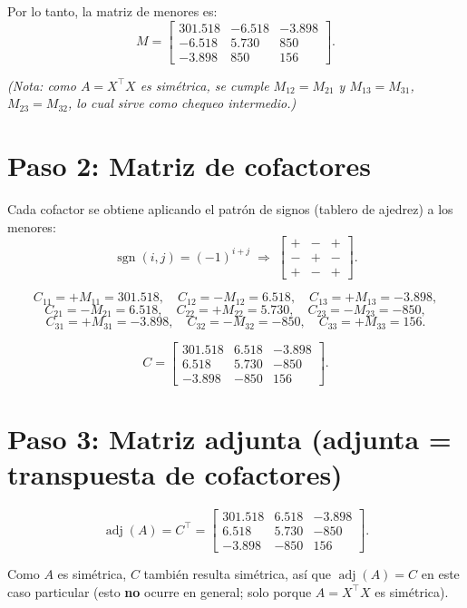 \documentclass[11pt]{article}
\begin{document}
Por lo tanto, la matriz de menores es:
\[
  M=\begin{bmatrix}
    301.518 & -6.518 & -3.898\\
    -6.518 & 5.730 & 850\\
    -3.898 & 850 & 156
  \end{bmatrix}.
\]

\emph{(Nota: como $A=X^\top X$ es simétrica, se cumple $M_{12}=M_{21}$ y $M_{13}=M_{31}$, $M_{23}=M_{32}$, lo cual sirve como chequeo intermedio.)}

\section{Paso 2: Matriz de cofactores}

Cada cofactor se obtiene aplicando el patrón de signos (tablero de ajedrez) a los menores:
\[
  \operatorname{sgn}(i,j)=(-1)^{i+j}
  \;\Longrightarrow\;
  \begin{bmatrix}
    + & - & +\\
    - & + & -\\
    + & - & +
  \end{bmatrix}.
\]

\[
  C_{11}=+M_{11}=301.518, \quad
  C_{12}=-M_{12}=6.518, \quad
  C_{13}=+M_{13}=-3.898,
\]
\[
  C_{21}=-M_{21}=6.518, \quad
  C_{22}=+M_{22}=5.730, \quad
  C_{23}=-M_{23}=-850,
\]
\[
  C_{31}=+M_{31}=-3.898, \quad
  C_{32}=-M_{32}=-850, \quad
  C_{33}=+M_{33}=156.
\]

\[
  C=\begin{bmatrix}
    301.518 & 6.518 & -3.898\\
    6.518 & 5.730 & -850\\
    -3.898 & -850 & 156
  \end{bmatrix}.
\]

\section{Paso 3: Matriz adjunta (adjunta = transpuesta de cofactores)}

\[
  \operatorname{adj}(A) = C^\top
  =\begin{bmatrix}
    301.518 & 6.518 & -3.898\\
    6.518 & 5.730 & -850\\
    -3.898 & -850 & 156
  \end{bmatrix}.
\]

Como $A$ es simétrica, $C$ también resulta simétrica, así que $\operatorname{adj}(A)=C$ en este caso particular (esto \textbf{no} ocurre en general; solo porque $A=X^\top X$ es simétrica).
\end{document}
